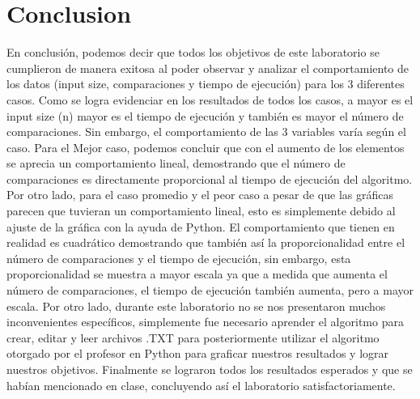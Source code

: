 \section{Conclusion}
En conclusión, podemos decir que todos los objetivos de este laboratorio se cumplieron de manera exitosa al poder observar y analizar el comportamiento de los datos (input size, comparaciones y tiempo de ejecución) para los 3 diferentes casos. Como se logra evidenciar en los resultados de todos los casos, a mayor es el input size (n) mayor es el tiempo de ejecución y también es mayor el número de comparaciones. Sin embargo, el comportamiento de las 3 variables varía según el caso. Para el Mejor caso, podemos concluir que con el aumento de los elementos se aprecia un comportamiento lineal, demostrando que el número de comparaciones es directamente proporcional al tiempo de ejecución del algoritmo. Por otro lado, para el caso promedio y el peor caso a pesar de que las gráficas parecen que tuvieran un comportamiento lineal, esto es simplemente debido al ajuste de la gráfica con la ayuda de Python. El comportamiento que tienen en realidad es cuadrático demostrando que también así la proporcionalidad entre el número de comparaciones y el tiempo de ejecución, sin embargo, esta proporcionalidad se muestra a mayor escala ya que a medida que aumenta el número de comparaciones, el tiempo de ejecución también aumenta, pero a mayor escala. Por otro lado, durante este laboratorio no se nos presentaron muchos inconvenientes específicos, simplemente fue necesario aprender el algoritmo para crear, editar y leer archivos .TXT para posteriormente utilizar el algoritmo otorgado por el profesor en Python para graficar nuestros resultados y lograr nuestros objetivos. Finalmente se lograron todos los resultados esperados y que se habían mencionado en clase, concluyendo así el laboratorio satisfactoriamente.